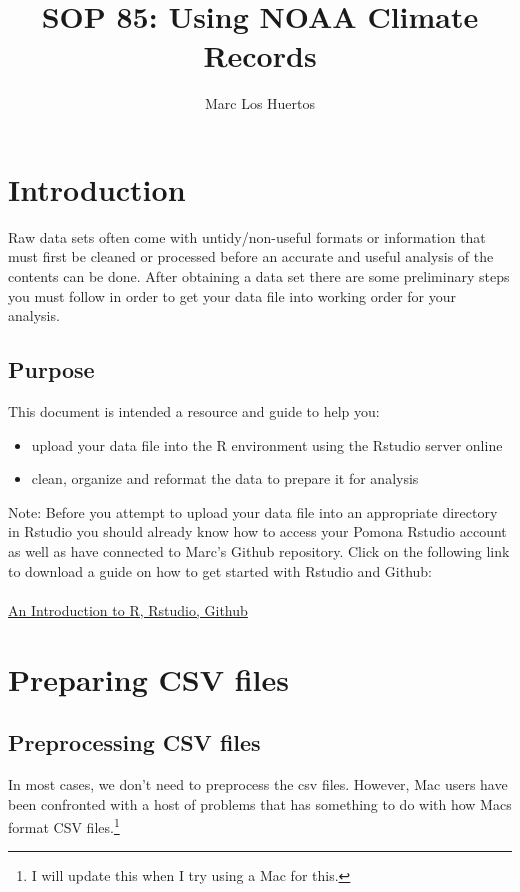 \documentclass{article}\usepackage[]{graphicx}\usepackage[]{color}
\title{SOP 85: Using NOAA Climate Records}
\author{Marc Los Huertos}
\begin{document}
\maketitle

\section{Introduction}
Raw data sets often come with untidy/non-useful formats or information that must first be cleaned or processed before an accurate and useful analysis of the contents can be done. After obtaining a data set there are some preliminary steps you must follow in order to get your data file into working order for your analysis. 

\subsection{Purpose}
This document is intended a resource and guide to help you: 
\begin{itemize}
\item upload your data file into the R environment using the Rstudio server online
\item clean, organize and reformat the data to prepare it for analysis
\end{itemize}

Note: Before you attempt to upload your data file into an appropriate directory in Rstudio you should already know how to access your Pomona Rstudio account as well as have connected to Marc's Github repository. Click on the following link to download a guide on how to get started with Rstudio and Github: \\
\\
\href{https://github.com/marclos/SOPs/raw/master/06_Rstudio_Github/Rstudio-and-Github_v03.pdf}{An Introduction to R, Rstudio, Github}

\section{Preparing CSV files}

\subsection{Preprocessing CSV files}

In most cases, we don't need to preprocess the csv files. However, Mac users have been confronted with a host of problems that has something to do with how Macs format CSV files.\footnote{I will update this when I try using a Mac for this.}
\end{document}
